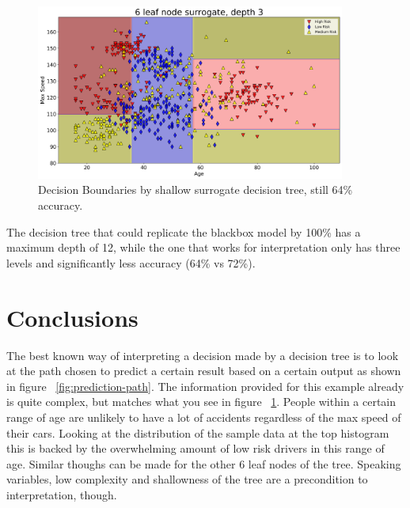 \documentclass{article} %
\begin{document}
\begin{figure}[h]
\begin{center}
\includegraphics[width=4.0in]{shallow-surrogate.png}
\end{center}
\caption{Decision Boundaries by shallow surrogate decision tree, still 64\% accuracy.}
\label{fig:surrogate-model}
\end{figure}

The decision tree that could replicate the blackbox model by 100\% has a maximum depth of 12, while the one that works for interpretation only has three levels and significantly less accuracy (64\% vs 72\%).

\section{Conclusions}

The best known way of interpreting a decision made by a decision tree is to look at the path chosen to predict a certain result based on a certain output as shown in figure ~\ref{fig:prediction-path}. The information provided for this example already is quite complex, but matches what you see in figure ~\ref{fig:surrogate-model}. People within a certain range of age are unlikely to have a lot of accidents regardless of the max speed of their cars. Looking at the distribution of the sample data at the top histogram this is backed by the overwhelming amount of low risk drivers in this range of age. Similar thoughs can be made for the other 6 leaf nodes of the tree. Speaking variables, low complexity and shallowness of the tree are a precondition to interpretation, though.
\end{document}
